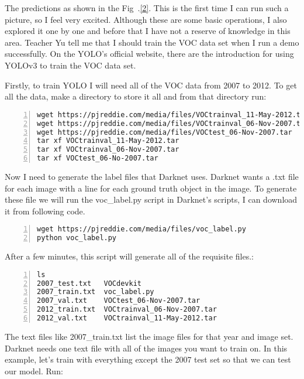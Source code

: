 \documentclass[a4paper]{article}
\begin{document}
The predictions as shown in the Fig~.\ref{2}. This is the first time I can run such a picture, so I feel very excited. Although these are some basic operations, I also explored it one by one and before that I have not a reserve of knowledge in this area. Teacher Yu tell me that I should train the VOC data set when I run a demo successfully. 
On the YOLO's official website, there are the introduction for using YOLOv3 to train the VOC data set. 
\par
Firstly, to train YOLO I will need all of the VOC data from 2007 to 2012. To get all the data, make a directory to store it all and from that directory run:
\begin{lstlisting}[numbers=left, numberstyle=\tiny,keywordstyle=\color{blue!70},commentstyle=\color{red!50!green!50!blue!50},frame=shadowbox, rulesepcolor=\color{red!20!green!20!blue!20}] 
wget https://pjreddie.com/media/files/VOCtrainval_11-May-2012.tar
wget https://pjreddie.com/media/files/VOCtrainval_06-Nov-2007.tar
wget https://pjreddie.com/media/files/VOCtest_06-Nov-2007.tar
tar xf VOCtrainval_11-May-2012.tar
tar xf VOCtrainval_06-Nov-2007.tar
tar xf VOCtest_06-No-2007.tar
\end{lstlisting}
\par
Now I need to generate the label files that Darknet uses. Darknet wants a .txt file for each image with a line for each ground truth object in the image. To generate these file we will run the voc\_label.py script in Darknet's scripts, I can download it from following code.
\begin{lstlisting}[numbers=left, numberstyle=\tiny,keywordstyle=\color{blue!70},commentstyle=\color{red!50!green!50!blue!50},frame=shadowbox, rulesepcolor=\color{red!20!green!20!blue!20}] 
wget https://pjreddie.com/media/files/voc_label.py
python voc_label.py
\end{lstlisting}
\par
After a few minutes, this script will generate all of the requisite files.:
\begin{lstlisting}[numbers=left, numberstyle=\tiny,keywordstyle=\color{blue!70},commentstyle=\color{red!50!green!50!blue!50},frame=shadowbox, rulesepcolor=\color{red!20!green!20!blue!20}] 
ls
2007_test.txt   VOCdevkit
2007_train.txt  voc_label.py
2007_val.txt    VOCtest_06-Nov-2007.tar
2012_train.txt  VOCtrainval_06-Nov-2007.tar
2012_val.txt    VOCtrainval_11-May-2012.tar
\end{lstlisting}
\par
The text files like 2007\_train.txt list the image files for that year and image set. Darknet needs one text file with all of the images you want to train on. In this example, let's train with everything except the 2007 test set so that we can test our model. Run:
\end{document}
